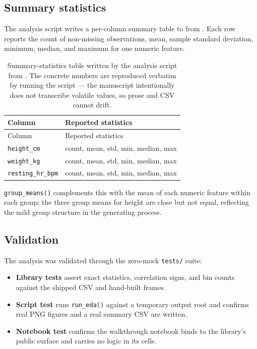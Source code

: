 \documentclass[
]{article}
\providecommand{\tightlist}{%
  \setlength{\itemsep}{0pt}\setlength{\parskip}{0pt}}
\begin{document}
\subsection{Summary statistics}\label{summary-statistics}

The analysis script writes a per-column summary table to
 from
. Each row reports the count of
non-missing observations, mean, sample standard deviation, minimum,
median, and maximum for one numeric feature.

\begin{longtable}[]{@{}ll@{}}
\caption{Summary-statistics table written by the analysis script from
\protect{}. The
concrete numbers are reproduced verbatim by running the script --- the
manuscript intentionally does not transcribe volatile values, so prose
and CSV cannot drift.}\label{tbl:summary_statistics}\tabularnewline
\toprule\noalign{}
Column & Reported statistics \\
\midrule\noalign{}
\endfirsthead
\toprule\noalign{}
Column & Reported statistics \\
\midrule\noalign{}
\endhead
\bottomrule\noalign{}
\endlastfoot
\texttt{height\_cm} & count, mean, std, min, median, max \\
\texttt{weight\_kg} & count, mean, std, min, median, max \\
\texttt{resting\_hr\_bpm} & count, mean, std, min, median, max \\
\end{longtable}

\texttt{group\_means()} complements this with the mean of each numeric
feature within each group; the three group means for height are close
but not equal, reflecting the mild group structure in the generating
process.

\subsection{Validation}\label{validation}

The analysis was validated through the zero-mock \texttt{tests/} suite:

\begin{itemize}
\tightlist
\item
  \textbf{Library tests} assert exact statistics, correlation signs, and
  bin counts against the shipped CSV and hand-built frames.
\item
  \textbf{Script test} runs \texttt{run\_eda()} against a temporary
  output root and confirms real PNG figures and a real summary CSV are
  written.
\item
  \textbf{Notebook test} confirms the walkthrough notebook binds to the
  library's public surface and carries no logic in its cells.
\end{itemize}
\end{document}

